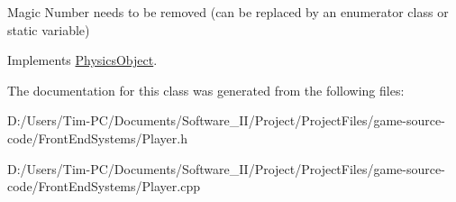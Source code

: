 Magic Number needs to be removed (can be replaced by an enumerator class or static variable) 

Implements \hyperlink{class_physics_object}{Physics\+Object}.



The documentation for this class was generated from the following files\+:\begin{DoxyCompactItemize}
\item 
D\+:/\+Users/\+Tim-\/\+P\+C/\+Documents/\+Software\+\_\+\+I\+I/\+Project/\+Project\+Files/game-\/source-\/code/\+Front\+End\+Systems/Player.\+h\item 
D\+:/\+Users/\+Tim-\/\+P\+C/\+Documents/\+Software\+\_\+\+I\+I/\+Project/\+Project\+Files/game-\/source-\/code/\+Front\+End\+Systems/Player.\+cpp\end{DoxyCompactItemize}
